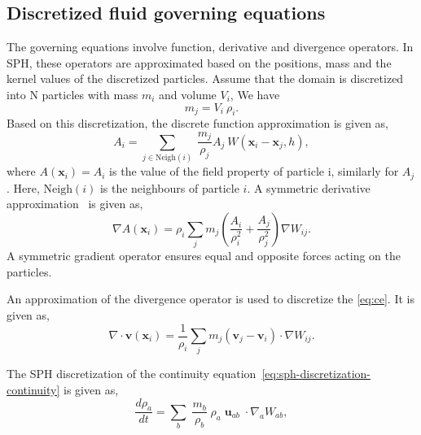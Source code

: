 \documentclass[preprint,12pt]{elsarticle}
\newcommand{\ten}[1]{\ensuremath{\mathbf{#1}}}
\begin{document}
\FloatBarrier%
\subsection{Discretized fluid governing equations}
\label{sec:sph--governing-equations}
The governing equations involve function, derivative and divergence
operators. In SPH, these operators are approximated based on the positions,
mass and the kernel values of the discretized particles. Assume that the
domain is discretized into N particles with mass $m_i$ and volume
$V_i$, We have
\begin{equation}
  \label{eq:mass_repr}
  m_j = V_i \> \rho_i.
\end{equation}
Based on this discretization, the discrete function approximation is given as,
\begin{equation}
  \label{eq:discrete_form}
  A_i = \sum_{j \in \text{Neigh}(i)}\> \frac{m_j}{\rho_j} A_j\> W(\ten{x}_i - \ten{x}_j, h),
\end{equation}
where $A(\boldsymbol{x}_i) = A_i$ is the value of the field property of
particle i, similarly for $A_j$. Here, $\text{Neigh}(i)$ is the neighbours of
particle $i$.  A symmetric derivative approximation~\cite{Violeau16} is given
as,
\begin{equation}
  \nabla A(\ten{x}_i) = \rho_i \sum_{j} m_j \left(\frac{A_i}{\rho_i^2} + \frac{A_j}{\rho_j^2}\right) \nabla W_{ij}.
\end{equation}
A symmetric gradient operator ensures equal and opposite forces acting on the
particles.


An approximation of the divergence operator is used to discretize the
\cref{eq:ce}.  It is given as,
\begin{equation}
  \label{intro:eq:sph-continu-div-final}
  \nabla \cdot \ten{v}(\ten{x}_i) = \frac{1}{\rho_i} \sum_{j} m_j \left(\ten{v}_j - \ten{v}_i\right) \cdot \nabla W_{ij}.
\end{equation}


The SPH discretization of the continuity
equation~\cref{eq:sph-discretization-continuity} is given as,
\begin{equation}
  \label{eq:sph-discretization-continuity}
  \frac{{d}\rho_a}{dt} = \sum_{b} \; \frac{m_b}{\rho_{b}} \;
  \rho_{a} \; {\ten{u}}_{ab} \; \cdot \nabla_{a} W_{ab},
\end{equation}
\end{document}
